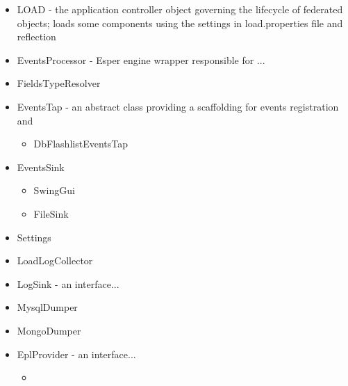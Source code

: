 \begin{itemize}
	\item LOAD - the application controller object governing the lifecycle of federated objects; loads some components using the settings in load.properties file and reflection
	\item EventsProcessor - Esper engine wrapper responsible for ...
	\item FieldsTypeResolver
	\item EventsTap - an abstract class providing a scaffolding for events registration and 
	\begin{itemize}
		\item DbFlashlistEventsTap
	\end{itemize}
	\item EventsSink
		\begin{itemize}
			\item{SwingGui}
			\item{FileSink}
		\end{itemize}
	\item Settings 
	\item LoadLogCollector
	\item LogSink - an interface...
	\item MysqlDumper
	\item MongoDumper
	\item EplProvider - an interface...
	\begin{itemize}
		\item
	\end{itemize}

\end{itemize}
